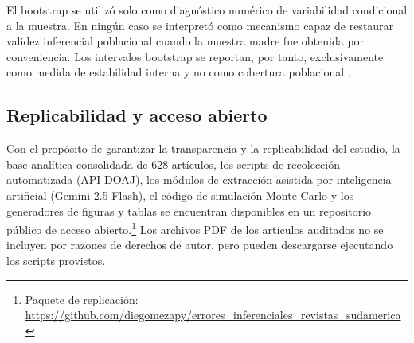 El bootstrap se utilizó solo como diagnóstico numérico de variabilidad condicional a la muestra. En ningún caso se interpretó como mecanismo capaz de restaurar validez inferencial poblacional cuando la muestra madre fue obtenida por conveniencia. Los intervalos bootstrap se reportan, por tanto, exclusivamente como medida de estabilidad interna y no como cobertura poblacional \citep{noordzij2010,reinhart2015}.

\subsection{Replicabilidad y acceso abierto}

Con el propósito de garantizar la transparencia y la replicabilidad del estudio, la base analítica consolidada de 628 artículos, los scripts de recolección automatizada (API DOAJ), los módulos de extracción asistida por inteligencia artificial (Gemini 2.5 Flash), el código de simulación Monte Carlo y los generadores de figuras y tablas se encuentran disponibles en un repositorio público de acceso abierto.\footnote{Paquete de replicación: \url{https://github.com/diegomezapy/errores_inferenciales_revistas_sudamerica}} Los archivos PDF de los artículos auditados no se incluyen por razones de derechos de autor, pero pueden descargarse ejecutando los scripts provistos.
